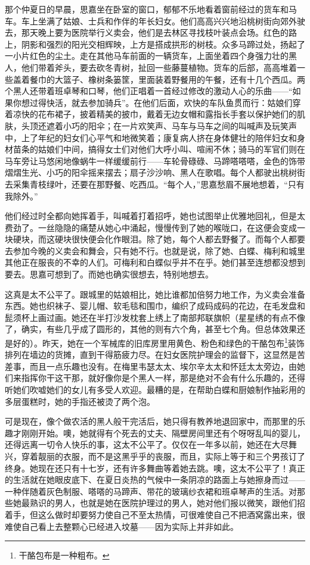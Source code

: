 \par 那个仲夏日的早晨，思嘉坐在卧室的窗口，郁郁不乐地看着窗前经过的货车和马车。车上坐满了姑娘、士兵和作伴的年长妇女。他们高高兴兴地沿桃树街向郊外驶去，那天晚上要为医院举行义卖会，他们是去林区寻找枝叶装点会场。红色的路上，阴影和强烈的阳光交相辉映，上方是搭成拱形的树枝。众多马蹄过处，扬起了一小片红色的尘土。走在其他马车前面的一辆货车，上面坐着四个身强力壮的黑人，他们带着斧头，要去砍冬青树，扯回一些藤蔓植物。货车的后部，高高堆着一些盖着餐巾的大篮子、橡树条篓筐，里面装着野餐用的午餐，还有十几个西瓜。两个黑人还带着班卓琴和口琴，他们正唱着一首经过修改的激动人心的乐曲——“如果你想过得快活，就去参加骑兵”。在他们后面，欢快的车队鱼贯而行：姑娘们穿着凉快的花布裙子，披着精美的披巾，戴着无边女帽和露指长手套以保护她们的肌肤，头顶还遮着小巧的阳伞；在一片欢笑声、马车与马车之间的叫喊声及玩笑声中，上了年纪的妇女们心平气和地微笑着；康复病人挤在身体健壮的陪伴妇女和身材苗条的姑娘们中间，搞得女士们对他们大呼小叫、喧闹不休；骑马的军官们则在马车旁让马悠闲地像蜗牛一样缓缓前行——车轮骨碌碌、马蹄嗒嗒嗒，金色的饰带熠熠生光、小巧的阳伞摇来摆去；扇子沙沙响、黑人在歌唱。每个人都驶出桃树街去采集青枝绿叶，还要在那野餐、吃西瓜。“每个人，”思嘉愁眉不展地想着，“只有我除外。”
\par 他们经过时全都向她挥着手，叫喊着打着招呼，她也试图举止优雅地回礼，但是太费劲了。一丝隐隐的痛楚从她心中涌起，慢慢传到了她的喉咙口，在这便会变成一块硬块，而这硬块很快便会化作眼泪。除了她，每个人都去野餐了。而每个人都要去参加今晚的义卖会和舞会，只有她不行。也就是说，除了她、白蝶、梅利和城里其他正在服丧的不幸的人们。可梅利和白蝶似乎并不在乎。她们甚至连想都没想到要去。思嘉可想到了。而她也确实很想去，特别地想去。
\par 这真是太不公平了。跟城里的姑娘相比，她比谁都加倍努力地工作，为义卖会准备东西。她也织袜子、婴儿帽、软毛毯和围巾，编织了成码成码的花边，在毛发盘和髭须杯上画过画。她还在半打沙发枕套上绣上了南部邦联旗帜（星星绣的有点不像了，确实，有些几乎成了圆形的，其他的则有六个角，甚至七个角。但总体效果还是好的）。昨天，她在一个军械库的旧库房里用黄色、粉色和绿色的干酪包布\footnote{干酪包布是一种粗布。}装饰排列在墙边的货摊，直到干得筋疲力尽。在妇女医院护理会的监督下，这显然是苦差事，而且一点乐趣也没有。在梅里韦瑟太太、埃尔辛太太和怀廷太太旁边，由她们来指挥你干这干那，就好像你是个黑人一样，那是绝对不会有什么乐趣的，还得听她们吹嘘她们的女儿有多受人欢迎。最糟的是，在帮助白蝶和厨娘制作抽彩用的多层蛋糕时，她的手指还被烫了两个泡。
\par 可是现在，像个做农活的黑人般干完活后，她只得有教养地退回家中，而那里的乐趣才刚刚开始。噢，她就得有个死去的丈夫、隔壁房间里还有个呀呀乱叫的婴儿，还得远离一切令人快乐的事，这太不公平了。仅仅在一年多以前，她还在大尽舞兴，穿着靓丽的衣服，而不是这黑乎乎的丧服，而且，实际上等于和三个男孩订了终身。她现在还只有十七岁，还有许多舞曲等着她去跳。噢，这太不公平了！真正的生活就在她眼皮底下、在夏日炎热的气候中一条阴凉的路面上与她擦身而过——一种伴随着灰色制服、嗒嗒的马蹄声、带花的玻璃纱衣裙和班卓琴声的生活。对那些她最熟识的男人，也就是她在医院护理过的男人，她对他们报以微笑，跟他们招着手，但这么做时却要努力使自己不至太热情，可很难使自己不把酒窝露出来，很难使自己看上去整颗心已经进入坟墓——因为实际上并非如此。
